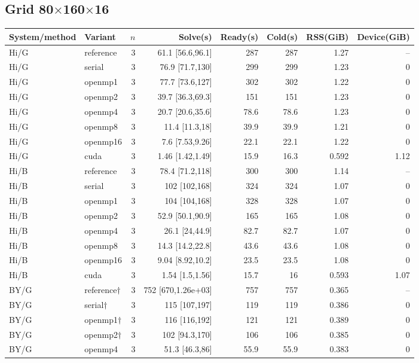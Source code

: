 \documentclass[11pt]{article}
\begin{document}
\subsection{Grid 80$\times$160$\times$16}
\footnotesize
\begin{longtable}{llrrrrrr}
\toprule System/method & Variant & $n$ & Solve(s) & Ready(s) & Cold(s) & RSS(GiB) & Device(GiB)\\
\midrule\endhead
Hi/G & reference & 3 & 61.1 [56.6,96.1] & 287 & 287 & 1.27 & --\\
Hi/G & serial & 3 & 76.9 [71.7,130] & 299 & 299 & 1.23 & 0\\
Hi/G & openmp1 & 3 & 77.7 [73.6,127] & 302 & 302 & 1.22 & 0\\
Hi/G & openmp2 & 3 & 39.7 [36.3,69.3] & 151 & 151 & 1.23 & 0\\
Hi/G & openmp4 & 3 & 20.7 [20.6,35.6] & 78.6 & 78.6 & 1.23 & 0\\
Hi/G & openmp8 & 3 & 11.4 [11.3,18] & 39.9 & 39.9 & 1.21 & 0\\
Hi/G & openmp16 & 3 & 7.6 [7.53,9.26] & 22.1 & 22.1 & 1.22 & 0\\
Hi/G & cuda & 3 & 1.46 [1.42,1.49] & 15.9 & 16.3 & 0.592 & 1.12\\
Hi/B & reference & 3 & 78.4 [71.2,118] & 300 & 300 & 1.14 & --\\
Hi/B & serial & 3 & 102 [102,168] & 324 & 324 & 1.07 & 0\\
Hi/B & openmp1 & 3 & 104 [104,168] & 328 & 328 & 1.07 & 0\\
Hi/B & openmp2 & 3 & 52.9 [50.1,90.9] & 165 & 165 & 1.08 & 0\\
Hi/B & openmp4 & 3 & 26.1 [24,44.9] & 82.7 & 82.7 & 1.07 & 0\\
Hi/B & openmp8 & 3 & 14.3 [14.2,22.8] & 43.6 & 43.6 & 1.08 & 0\\
Hi/B & openmp16 & 3 & 9.04 [8.92,10.2] & 23.5 & 23.5 & 1.08 & 0\\
Hi/B & cuda & 3 & 1.54 [1.5,1.56] & 15.7 & 16 & 0.593 & 1.07\\
BY/G & reference$\dagger$ & 3 & 752 [670,1.26e+03] & 757 & 757 & 0.365 & --\\
BY/G & serial$\dagger$ & 3 & 115 [107,197] & 119 & 119 & 0.386 & 0\\
BY/G & openmp1$\dagger$ & 3 & 116 [116,192] & 121 & 121 & 0.389 & 0\\
BY/G & openmp2$\dagger$ & 3 & 102 [94.3,170] & 106 & 106 & 0.385 & 0\\
BY/G & openmp4 & 3 & 51.3 [46.3,86] & 55.9 & 55.9 & 0.383 & 0\\

\end{longtable}
\end{document}
